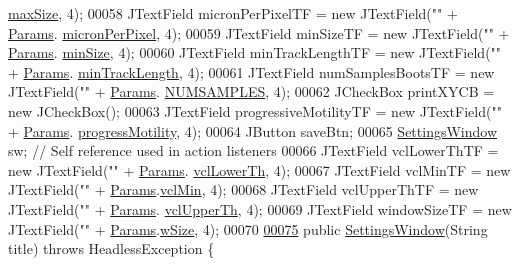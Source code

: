 \begin{DoxyCode}
      \hyperlink{classdata_1_1_params_a7274c4f365a3b3d5e70f4c0e797684ac}{maxSize}, 4);
00058   JTextField     micronPerPixelTF      = \textcolor{keyword}{new} JTextField(\textcolor{stringliteral}{""} + \hyperlink{classdata_1_1_params}{Params}.
      \hyperlink{classdata_1_1_params_a19331ee97ef3c422984fc7dff976549e}{micronPerPixel}, 4);
00059   JTextField     minSizeTF             = \textcolor{keyword}{new} JTextField(\textcolor{stringliteral}{""} + \hyperlink{classdata_1_1_params}{Params}.
      \hyperlink{classdata_1_1_params_a0aac8d82501e8bd6df290478d853662b}{minSize}, 4);
00060   JTextField     minTrackLengthTF      = \textcolor{keyword}{new} JTextField(\textcolor{stringliteral}{""} + \hyperlink{classdata_1_1_params}{Params}.
      \hyperlink{classdata_1_1_params_aa730fe10ba7a04b3871e8ff2ea8cc834}{minTrackLength}, 4);
00061   JTextField     numSamplesBootsTF     = \textcolor{keyword}{new} JTextField(\textcolor{stringliteral}{""} + \hyperlink{classdata_1_1_params}{Params}.
      \hyperlink{classdata_1_1_params_ae808f1c980157cfd070c6e09e587e2aa}{NUMSAMPLES}, 4);
00062   JCheckBox      printXYCB             = \textcolor{keyword}{new} JCheckBox();
00063   JTextField     progressiveMotilityTF = \textcolor{keyword}{new} JTextField(\textcolor{stringliteral}{""} + \hyperlink{classdata_1_1_params}{Params}.
      \hyperlink{classdata_1_1_params_ae9dd6b8ec81f8ae0b40a4e8e2d9cdc06}{progressMotility}, 4);
00064   JButton        saveBtn;
00065   \hyperlink{classgui_1_1_settings_window}{SettingsWindow} sw; \textcolor{comment}{// Self reference used in action listeners}
00066   JTextField     vclLowerThTF          = \textcolor{keyword}{new} JTextField(\textcolor{stringliteral}{""} + \hyperlink{classdata_1_1_params}{Params}.
      \hyperlink{classdata_1_1_params_af9a2118a2e00978d900279677c64bbeb}{vclLowerTh}, 4);
00067   JTextField     vclMinTF              = \textcolor{keyword}{new} JTextField(\textcolor{stringliteral}{""} + \hyperlink{classdata_1_1_params}{Params}.\hyperlink{classdata_1_1_params_af4cb43f0bfe24c14e75780187235376c}{vclMin}, 4);
00068   JTextField     vclUpperThTF          = \textcolor{keyword}{new} JTextField(\textcolor{stringliteral}{""} + \hyperlink{classdata_1_1_params}{Params}.
      \hyperlink{classdata_1_1_params_ae0c29f446e3d569d730c8251a31e7ac2}{vclUpperTh}, 4);
00069   JTextField     windowSizeTF          = \textcolor{keyword}{new} JTextField(\textcolor{stringliteral}{""} + \hyperlink{classdata_1_1_params}{Params}.\hyperlink{classdata_1_1_params_ad1b7844e5f66ee81c3de06d1a8ca645e}{wSize}, 4);
00070 
\hypertarget{_settings_window_8java_source_l00075}{}\hyperlink{classgui_1_1_settings_window_a683036e760caa7899d0d992b16a0ce26}{00075}   \textcolor{keyword}{public} \hyperlink{classgui_1_1_settings_window_a683036e760caa7899d0d992b16a0ce26}{SettingsWindow}(String title) \textcolor{keywordflow}{throws} HeadlessException \{

\end{DoxyCode}
